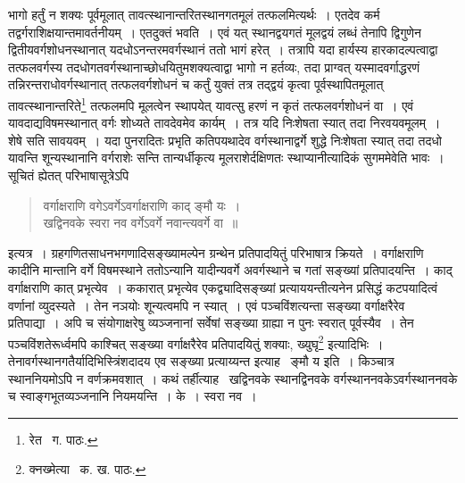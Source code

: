 \documentclass[11pt, openany]{book}
\begin{document}
{\newpage

\noindent भागो हर्तुं न शक्यः पूर्वमूलात् तावत्स्थानान्तरितस्थानगतमूलं तत्फलमित्यर्थः~। एतदेव कर्म तद्वर्गराशिक्षयान्तमावर्तनीयम्~। एतदुक्तं भवति~। एवं यत् स्थानद्वयगतं मूलद्वयं लब्धं तेनापि द्विगुणेन द्वितीयवर्गशोधनस्थानात् यदधोऽनन्तरमवर्गस्थानं ततो भागं हरेत्~। तत्रापि यदा हार्यस्य हारकादल्पत्वाद्वा तत्फलवर्गस्य तदधोगतवर्गस्थानाच्छोधयितुमशक्यत्वाद्वा भागो न हर्तव्यः, तदा प्राग्वत् यस्मादवर्गाद्धरणं तन्निरन्तराधोवर्गस्थानात् तत्फलवर्गशोधनं च कर्तुं युक्तं तत्र तद्द्वयं कृत्वा पूर्वस्थापितमूलात् तावत्स्थानान्तरिते\renewcommand{\thefootnote}{१}\footnote{रेत \textendash\ ग. पाठः.} तत्फलमपि मूलत्वेन स्थापयेत् यावत्सु हरणं न कृतं तत्फलवर्गशोधनं वा~। एवं यावदाद्यविषमस्थानात् वर्गः शोध्यते तावदेवमेव कार्यम्~। तत्र
यदि निःशेषता स्यात् तदा निरवयवमूलम्~। शेषे सति सावयवम्~। यदा पुनरादितः प्रभृति कतिपयथादेव वर्गस्थानाद्वर्गे शुद्धे निःशेषता स्यात् तदा तदधो यावन्ति शून्यस्थानानि वर्गराशेः सन्ति तान्यर्धीकृत्य मूलराशेर्दक्षिणतः स्थाप्यानीत्यादिकं सुगममेवेति भावः~। सूचितं ह्येतत् परिभाषासूत्रेऽपि\textendash 

\begin{quote}
{\qt वर्गाक्षराणि वगेऽवर्गेऽवर्गाक्षराणि काद् ङ्मौ यः~।\\
खद्विनवके स्वरा नव वर्गेऽवर्गे नवान्त्यवर्गे वा~॥}
\end{quote}

\noindent इत्यत्र~। ग्रहगणितसाधनभगणादिसङ्ख्यामल्पेन ग्रन्थेन प्रतिपादयितुं परिभाषात्र क्रियते~। वर्गाक्षराणि कादीनि मान्तानि वर्गे विषमस्थाने ततोऽन्यानि यादीन्यवर्गे अवर्गस्थाने च गतां सङ्ख्यां प्रतिपादयन्ति~। काद् वर्गाक्षराणि कात् प्रभृत्येव~। ककारात् प्रभृत्येव
एकद्व्यादिसङ्ख्यां प्रत्याययन्तीत्यनेन प्रसिद्धं कटपयादित्वं वर्णानां व्युदस्यते~। तेन नञयोः शून्यत्वमपि न स्यात्~। एवं पञ्चविंशत्यन्ता सङ्ख्या वर्गाक्षरैरेव प्रतिपाद्या~। अपि च संयोगाक्षरेषु व्यञ्जनानां सर्वेषां सङ्ख्या ग्राह्या न पुनः स्वरात् पूर्वस्यैव~। तेन पञ्चविंशतेरूर्ध्वमपि काश्चित् सङ्ख्या वर्गाक्षरैरेव प्रतिपादयितुं शक्याः, ख्युघृ\renewcommand{\thefootnote}{२}\footnote{क्नख्मेत्या \textendash\ क. ख. पाठः.} इत्यादिभिः~। तेनावर्गस्थानगतैर्यादिभिस्त्रिंशदादय एव सङ्ख्या प्रत्याय्यन्त इत्याह \textendash\ ङ्मौ य इति~। किञ्चात्र स्थाननियमोऽपि न वर्णक्रमवशात्~। कथं तर्हीत्याह \textendash\ खद्विनवके स्थानद्विनवके वर्गस्थाननवकेऽवर्गस्थाननवके च स्वाङ्गभूतव्यञ्जनानि नियमयन्ति~। के~। स्वरा नव~।


\newpage

}
\end{document}
